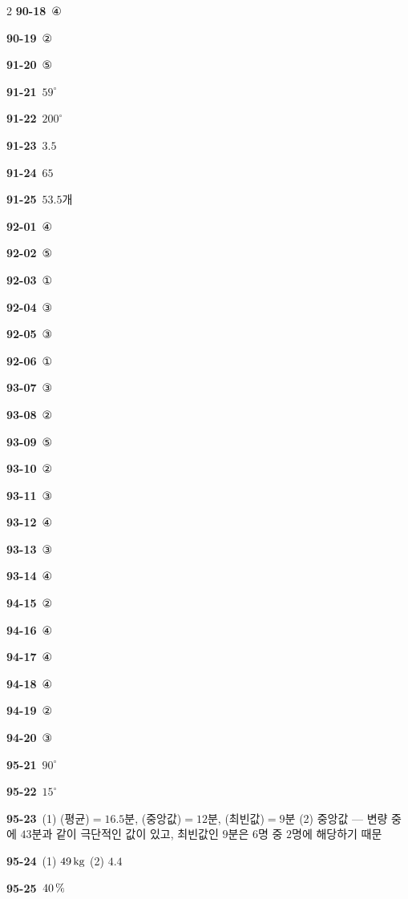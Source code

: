 \documentclass[10pt,a4paper]{article}
\begin{document}
\begin{multicols}{2}
\noindent\textbf{90-18}\ ④\par
\noindent\textbf{90-19}\ ②\par
\noindent\textbf{91-20}\ ⑤\par
\noindent\textbf{91-21}\ $59^\circ$\par
\noindent\textbf{91-22}\ $200^\circ$\par
\noindent\textbf{91-23}\ $3.5$\par
\noindent\textbf{91-24}\ $65$\par
\noindent\textbf{91-25}\ $53.5$개\par
\noindent\textbf{92-01}\ ④\par
\noindent\textbf{92-02}\ ⑤\par
\noindent\textbf{92-03}\ ①\par
\noindent\textbf{92-04}\ ③\par
\noindent\textbf{92-05}\ ③\par
\noindent\textbf{92-06}\ ①\par
\noindent\textbf{93-07}\ ③\par
\noindent\textbf{93-08}\ ②\par
\noindent\textbf{93-09}\ ⑤\par
\noindent\textbf{93-10}\ ②\par
\noindent\textbf{93-11}\ ③\par
\noindent\textbf{93-12}\ ④\par
\noindent\textbf{93-13}\ ③\par
\noindent\textbf{93-14}\ ④\par
\noindent\textbf{94-15}\ ②\par
\noindent\textbf{94-16}\ ④\par
\noindent\textbf{94-17}\ ④\par
\noindent\textbf{94-18}\ ④\par
\noindent\textbf{94-19}\ ②\par
\noindent\textbf{94-20}\ ③\par
\noindent\textbf{95-21}\ $90^\circ$\par
\noindent\textbf{95-22}\ $15^\circ$\par
\noindent\textbf{95-23}\ (1) (평균)$=16.5$분, (중앙값)$=12$분, (최빈값)$=9$분 (2) 중앙값 — 변량 중에 $43$분과 같이 극단적인 값이 있고, 최빈값인 $9$분은 $6$명 중 $2$명에 해당하기 때문\par
\noindent\textbf{95-24}\ (1) $49\mkern3mu \mathrm{kg}$ (2) $4.4$\par
\noindent\textbf{95-25}\ $40\mkern3mu \%$\par

\end{multicols}
\end{document}
